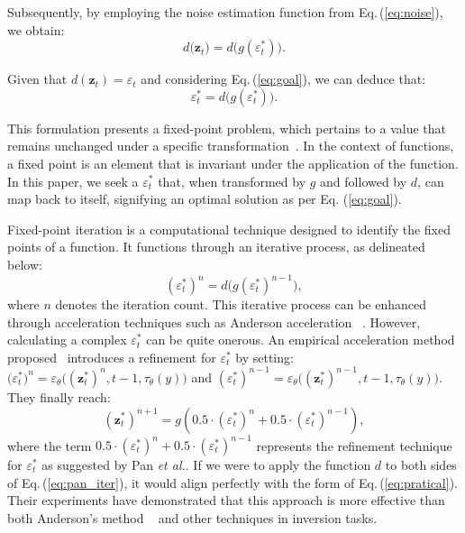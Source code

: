 \documentclass[letterpaper]{article} %
\begin{document}
Subsequently, by employing the noise estimation function from Eq.\,(\ref{eq:noise}), we obtain:
\begin{equation}\label{eq:two_functions}
d\big(\mathbf{z}_t) = d\big(g(\varepsilon_t^*)\big).
\end{equation}


Given that $d(\mathbf{z}_t)  = \varepsilon_{t}$ and considering Eq.\,(\ref{eq:goal}), we can deduce that:
\begin{equation}
    \varepsilon_{t}^* = d\big(g(\varepsilon_t^*)\big).
\end{equation}



This formulation presents a fixed-point problem, which pertains to a value that remains unchanged under a specific transformation~\cite{bauschke2011fixed}.  In the context of functions, a fixed point is an element that is invariant under the application of the function. In this paper, we seek a $\varepsilon^*_t$ that, when transformed by $g$ and followed by $d$, can map back to itself, signifying an optimal solution as per Eq. (\ref{eq:goal}).


Fixed-point iteration is a computational technique designed to identify the fixed points of a function. It functions through an iterative process, as delineated below:
\begin{equation}\label{eq:pratical}
(\varepsilon^*_{t})^n = d\big(g(\varepsilon^*_{t})^{n-1}\big),
\end{equation}
where $n$ denotes the iteration count. This iterative process can be enhanced through acceleration techniques such as Anderson acceleration ~\cite{anderson1965iterative}.
%
However, calculating a complex $\varepsilon^*_{t}$ can be quite onerous. An empirical acceleration method proposed~\cite{pan2023effective} introduces a refinement for $\varepsilon_t^*$ by setting: $\big(\varepsilon^*_{t})^n = \varepsilon_{\theta}(({\mathbf{z}^{*}_{t}})^{n},t-1,\tau_{\theta}(y)\big)$ and $(\varepsilon^*_{t})^{n-1} = \varepsilon_{\theta}\big(({\mathbf{z}^{*}_{t}})^{n-1},t-1,\tau_{\theta}(y)\big)$. They finally reach:
\begin{equation}\label{eq:pan_iter}
({\mathbf{z}^{*}_{t}})^{n+1} = g(0.5 \cdot (\varepsilon^*_{t})^n+0.5 \cdot (\varepsilon^*_{t})^{n-1}),
\end{equation}
%
where the term $0.5 \cdot (\varepsilon^*_{t})^n+0.5 \cdot (\varepsilon^*_{t})^{n-1}$ represents the refinement technique for $\varepsilon^*_{t}$ as suggested by Pan \emph{et al.}. If we were to apply the function $d$ to both sides of Eq.\,(\ref{eq:pan_iter}), it would align perfectly with the form of Eq.\,(\ref{eq:pratical}). Their experiments have demonstrated that this approach is more effective than both Anderson's method ~\cite{anderson1965iterative} and other techniques in inversion tasks.
\end{document}

